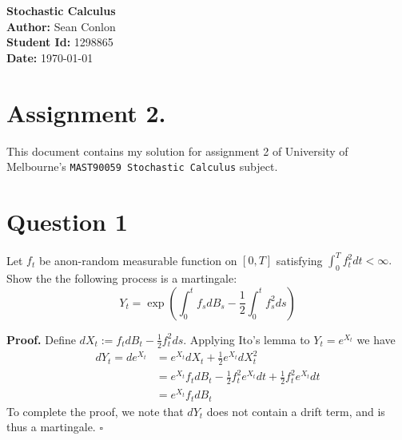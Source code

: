 \documentclass{article}
\begin{document}
\begin{titlepage}
    \centering
    {\Huge \textbf{Stochastic Calculus}}\\[1.5cm] %
    \textbf{Author:} Sean Conlon\\[1cm] %
    \textbf{Student Id:} 1298865\\[1cm]
    \textbf{Date:} \today\\[3cm] %
    
    \section*{Assignment 2.}
    This document contains my solution for assignment 2 of University of Melbourne's \texttt{MAST90059 Stochastic Calculus} subject.

    \tableofcontents
    
\end{titlepage}

\newpage
\section{Question 1}

\begin{tcolorbox}
[colframe=black,colback=gray!5,boxrule=0.5pt]
Let $f_t$ be  anon-random measurable function on $[0,T]$ satisfying $\int_0^Tf_t^2dt<\infty.$ Show the the following process is a martingale: 
$$Y_t = \exp\left(\int_0^t f_sdB_s - \frac{1}{2}\int_0^t f_s^2ds\right)$$
\end{tcolorbox}
\textbf{Proof.} Define $dX_t := f_tdB_t - \frac{1}{2}f_t^2ds$. Applying Ito's lemma to $Y_t = e^{X_t}$ we have
\begin{align*}
    dY_t = de^{X_t} &= e^{X_t}dX_t + \frac{1}{2}e^{X_t}dX_t^2 \\
    &= e^{X_t} f_tdB_t - \frac{1}{2}f_t^2e^{X_t}dt + \frac{1}{2}f_t^2e^{X_t}dt \\
    &= e^{X_t}f_t dB_t
\end{align*}
To complete the proof, we note that $dY_t$ does not contain a drift term, and is thus a martingale. $\square$


\newpage
\end{document}
